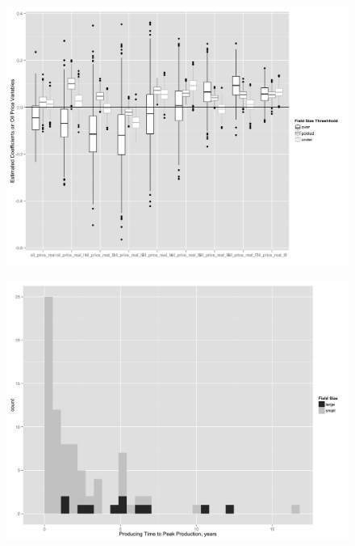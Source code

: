 \documentclass{beamer}
\begin{document}
\begin{frame}[plain]
	\begin{figure}
	\includegraphics[width=1\textwidth]{figures/gam_prepeak_pres.png}
	\label{gam_prepeak_print}
	\end{figure}
\end{frame}

\begin{frame}[plain]
	\begin{figure}
		\includegraphics[width=.8\textwidth]{figures/field_time_to_peak_pres.png}		
		\label{field_time_to_peak}
	\end{figure}
\end{frame}
\end{document}
